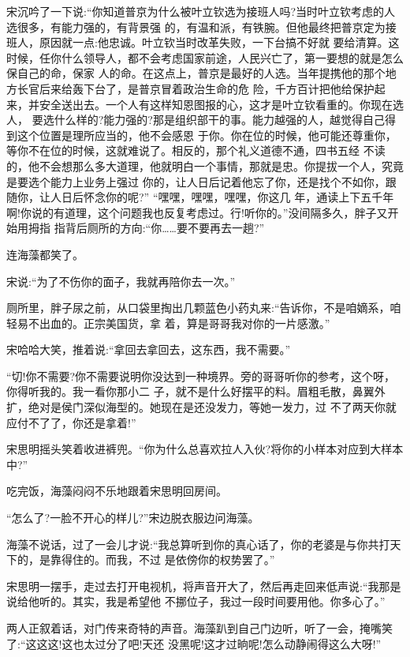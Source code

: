 \documentclass[11pt,a4paper,onecolumn]{article}
\begin{document}
宋沉吟了一下说:``你知道普京为什么被叶立钦选为接班人吗?当时叶立钦考虑的人选很多，有能力强的，有背景强
的，有温和派，有铁腕。但他最终把普京定为接班人，原因就一点:他忠诚。叶立钦当时改革失败，一下台搞不好就
要给清算。这时候，任你什么领导人，都不会考虑国家前途，人民兴亡了，第一要想的就是怎么保自己的命，保家
人的命。在这点上，普京是最好的人选。当年提携他的那个地方长官后来给轰下台了，是普京冒着政治生命的危
险，千方百计把他给保护起来，并安全送出去。一个人有这样知恩图报的心，这才是叶立钦看重的。你现在选人，
要选什么样的?能力强的?那是组织部干的事。能力越强的人，越觉得自己得到这个位置是理所应当的，他不会感恩
于你。你在位的时候，他可能还尊重你，等你不在位的时候，这就难说了。相反的，那个礼义道德不通，四书五经
不读的，他不会想那么多大道理，他就明白一个事情，那就是忠。你提拔一个人，究竟是要选个能力上业务上强过
你的，让人日后记着他忘了你，还是找个不如你，跟随你，让人日后怀念你的呢?'' ``嘿嘿，嘿嘿，嘿嘿，你这几
年，通读上下五千年啊!你说的有道理，这个问题我也反复考虑过。行!听你的。''没间隔多久，胖子又开始用拇指
指背后厕所的方向:``你……要不要再去一趟?''

连海藻都笑了。

宋说:``为了不伤你的面子，我就再陪你去一次。''

厕所里，胖子尿之前，从口袋里掏出几颗蓝色小药丸来:``告诉你，不是咱嫡系，咱轻易不出血的。正宗美国货，拿
着，算是哥哥我对你的一片感激。''

宋哈哈大笑，推着说:``拿回去拿回去，这东西，我不需要。''

``切!你不需要?你不需要说明你没达到一种境界。旁的哥哥听你的参考，这个呀，你得听我的。我一看你那小二
子，就不是什么好摆平的料。眉粗毛散，鼻翼外扩，绝对是侯门深似海型的。她现在是还没发力，等她一发力，过
不了两天你就应付不了了，你还是拿着!''

宋思明摇头笑着收进裤兜。``你为什么总喜欢拉人入伙?将你的小样本对应到大样本中?''

吃完饭，海藻闷闷不乐地跟着宋思明回房间。

``怎么了?一脸不开心的样儿?''宋边脱衣服边问海藻。

海藻不说话，过了一会儿才说:``我总算听到你的真心话了，你的老婆是与你共打天下的，是靠得住的。而我，不过
是依傍你的权势罢了。''

宋思明一摆手，走过去打开电视机，将声音开大了，然后再走回来低声说:``我那是说给他听的。其实，我是希望他
不挪位子，我过一段时间要用他。你多心了。''

两人正叙着话，对门传来奇特的声音。海藻趴到自己门边听，听了一会，掩嘴笑了:``这这这!这也太过分了吧!天还
没黑呢!这才过晌呢!怎么动静闹得这么大呀!''
\end{document}
